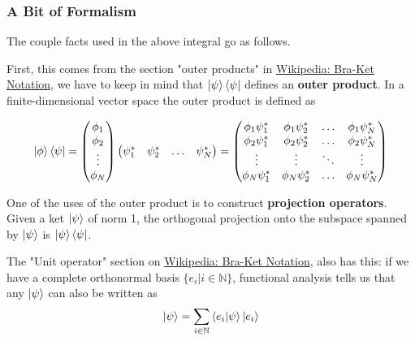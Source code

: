 \subsubsection{A Bit of Formalism}

The couple facts used in the above integral go as follows.

First, this comes from the section "outer products" in
\href{https://en.wikipedia.org/wiki/Bra%E2%80%93ket_notation}{Wikipedia: Bra-Ket Notation},
we have to keep in mind that $\ket{\psi}\bra{\psi}$ defines an \textbf{outer product}.
In a finite-dimensional vector space the outer product is defined as

$$
\ket{\phi}\bra{\psi}
=
\begin{pmatrix}
    \phi_1 \\
    \phi_2 \\
    \vdots \\
    \phi_N 
\end{pmatrix}
\begin{pmatrix}
    \psi_{1}^{*} & \psi_{2}^{*} & \ldots & \psi_{N}^{*}
\end{pmatrix}
=
\begin{pmatrix} 
    \phi_1 \psi_{1}^{*} & \phi_1 \psi_{2}^{*} & \dots  & \phi_1 \psi_{N}^{*} \\
    \phi_2 \psi_{1}^{*} & \phi_2 \psi_{2}^{*} & \dots  & \phi_2 \psi_{N}^{*} \\
    \vdots              & \vdots              & \ddots & \vdots              \\
    \phi_N \psi_{1}^{*} & \phi_N \psi_{2}^{*} & \dots  & \phi_N \psi_{N}^{*} \\
\end{pmatrix}
$$

One of the uses of the outer product is to construct \textbf{projection operators}. Given a ket $\ket{\psi}$
of norm 1, the orthogonal projection onto the subspace spanned by $\ket{\psi}$ is $\ket{\psi}\bra{\psi}$.


The "Unit operator" section on \href{https://en.wikipedia.org/wiki/Bra%E2%80%93ket_notation}{Wikipedia: Bra-Ket Notation},
also has this: if we have a complete orthonormal basis $\{ e_i | i\in\mathbb{N} \}$,
functional analysis tells us that any $\ket{\psi}$ can also be written as
\begin{equation}
\ket{\psi} =
\sum_{i\in\mathbb{N}} \braket{e_i | \psi} \ket{e_i} %
\end{equation}

